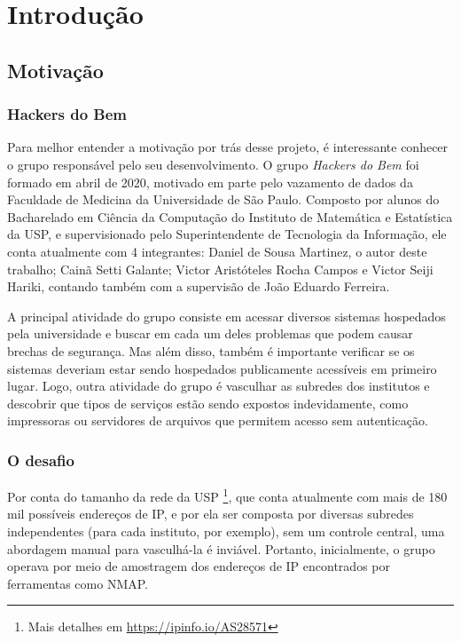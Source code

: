 
\chapter{Introdução}
\label{cap:introducao}

\section{Motivação}

\subsection{Hackers do Bem}
Para melhor entender a motivação por trás desse projeto, é interessante conhecer o grupo responsável pelo seu desenvolvimento. O grupo \textit{Hackers do Bem} foi formado em abril de 2020, motivado em parte pelo vazamento de dados da Faculdade de Medicina da Universidade de São Paulo. Composto por alunos do Bacharelado em Ciência da Computação do Instituto de Matemática e Estatística da USP, e supervisionado pelo Superintendente de Tecnologia da Informação, ele conta atualmente com 4 integrantes: Daniel de Sousa Martinez, o autor deste trabalho; Cainã Setti Galante; Victor Aristóteles Rocha Campos e Victor Seiji Hariki, contando também com a supervisão de João Eduardo Ferreira.

A principal atividade do grupo consiste em acessar diversos sistemas hospedados pela universidade e buscar em cada um deles problemas que podem causar brechas de segurança. Mas além disso, também é importante verificar se os sistemas deveriam estar sendo hospedados publicamente acessíveis em primeiro lugar. Logo, outra atividade do grupo é vasculhar as subredes
dos institutos e descobrir que tipos de serviços estão sendo expostos indevidamente, como impressoras ou servidores de arquivos que permitem acesso sem autenticação. 


% 
\subsection{O desafio}

Por conta do tamanho da rede da USP \footnote{Mais detalhes em \url{https://ipinfo.io/AS28571}}, 
que conta atualmente com mais de 180 mil possíveis endereços de IP,  e por ela ser composta por diversas subredes independentes (para cada instituto, por exemplo), sem um controle central, uma abordagem manual para vasculhá-la é inviável. Portanto, inicialmente, o grupo operava por meio de amostragem dos endereços de IP encontrados por ferramentas como NMAP. 


